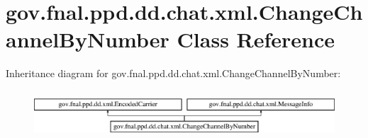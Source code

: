 \hypertarget{classgov_1_1fnal_1_1ppd_1_1dd_1_1chat_1_1xml_1_1ChangeChannelByNumber}{\section{gov.\-fnal.\-ppd.\-dd.\-chat.\-xml.\-Change\-Channel\-By\-Number Class Reference}
\label{classgov_1_1fnal_1_1ppd_1_1dd_1_1chat_1_1xml_1_1ChangeChannelByNumber}
}
Inheritance diagram for gov.\-fnal.\-ppd.\-dd.\-chat.\-xml.\-Change\-Channel\-By\-Number\-:\begin{figure}[H]
\begin{center}
\leavevmode
\includegraphics[height=1.789137cm]{classgov_1_1fnal_1_1ppd_1_1dd_1_1chat_1_1xml_1_1ChangeChannelByNumber}
\end{center}
\end{figure}
